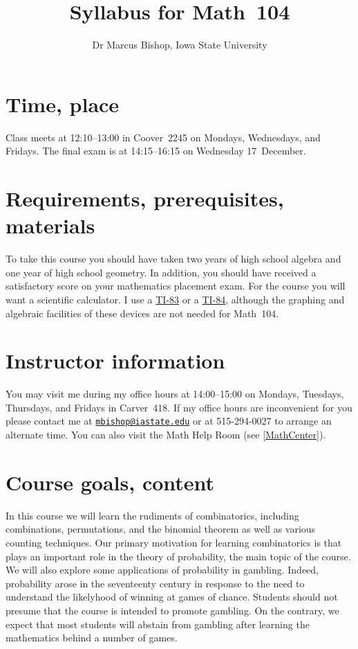 \documentclass[11pt]{article}
\title{Syllabus for Math~104}
\author{Dr Marcus Bishop, Iowa State University}
\begin{document}
\maketitle

\section{Time, place}\label{Time} Class meets at 12:10--13:00
in Coover~2245 on Mondays, Wednesdays, and Fridays.
The final exam is at 14:15--16:15 on Wednesday 17~December.

\section{Requirements, prerequisites, materials}
To take this course you should have taken two
years of high school algebra and one year of high school geometry.
In addition, you should
have received a satisfactory score on your mathematics placement exam.
For the course you will want a scientific calculator.
I use a \href{http://en.wikipedia.org/wiki/TI-83}{TI-83} or a
\href{http://en.wikipedia.org/wiki/TI-84}{TI-84}, although
the graphing and algebraic facilities of these devices are
not needed for Math~104.

\section{Instructor information} You may visit me during my office 
hours at 14:00--15:00 on Mondays, Tuesdays, Thursdays, and Fridays
in Carver~418. If my office hours are inconvenient for you
please contact me at 
\href{mailto:mbishop@iastate.edu}{\tt mbishop@iastate.edu} or at 
515-294-0027 to arrange an alternate time.
You can also visit the Math Help Room (see \autoref{MathCenter}).

\section{Course goals, content}
In this course we will learn the rudiments of combinatorics,
including combinations, permutations, and the binomial theorem
as well as various counting techniques.
Our primary motivation for learning combinatorics is that
plays an important role in the theory of probability, the main
topic of the course. We will also explore some
applications of probability in gambling. Indeed, probability
arose in the seventeenty century in response to the need
to understand the likelyhood of winning at games of chance.
Students should not presume that the course is intended to
promote gambling. On the contrary, we expect that most
students will abstain from gambling after learning the mathematics
behind a number of games.
\end{document}
